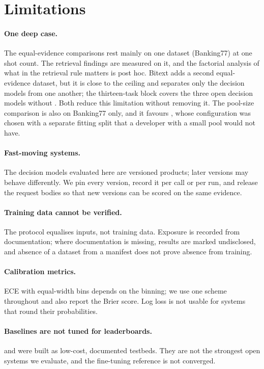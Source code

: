 \section{Limitations}
\label{sec:limitations}

\paragraph{One deep case.} The equal-evidence comparisons rest mainly on one dataset (Banking77) at one shot count.
The retrieval findings are measured on it, and the factorial analysis of what in the retrieval rule matters is post
hoc. Bitext adds a second equal-evidence dataset, but it is close to the ceiling and separates only the decision
models from one another; the thirteen-task block covers the three open decision models without \jev. Both reduce
this limitation without removing it. The pool-size comparison is also on Banking77 only, and it favours \orb, whose
configuration was chosen with a separate fitting split that a developer with a small pool would not have.

\paragraph{Fast-moving systems.} The decision models evaluated here are versioned products; later versions may
behave differently. We pin every version, record it per call or per run, and release the request bodies so that new
versions can be scored on the same evidence.

\paragraph{Training data cannot be verified.} The protocol equalises inputs, not training data. Exposure is recorded
from documentation; where documentation is missing, results are marked undisclosed, and absence of a dataset from a
manifest does not prove absence from training.

\paragraph{Calibration metrics.} ECE with equal-width bins depends on the binning; we use one scheme throughout and
also report the Brier score. Log loss is not usable for systems that round their probabilities.

\paragraph{Baselines are not tuned for leaderboards.} \orb{} and \gj{} were built as low-cost, documented testbeds.
They are not the strongest open systems we evaluate, and the fine-tuning reference is not converged.

